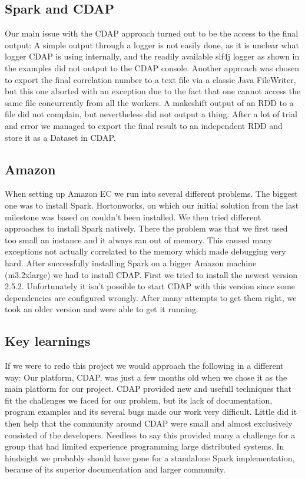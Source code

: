 \documentclass[
10pt, %
a4paper, %
oneside, %
headinclude,footinclude, %
useAMS,
usenatbib
]{template/mn2e}  %
\begin{document}
\subsection{Spark and CDAP}
Our main issue with the CDAP approach turned out to be the access to the final output: A simple output through a logger is not easily done, as it is unclear what logger CDAP is using internally, and the readily available slf4j logger as shown in the examples did not output to the CDAP console. Another approach was chosen to export the final correlation number to a text file via a classic Java FileWriter, but this one aborted with an exception due to the fact that one cannot access the same file concurrently from all the workers. A makeshift output of an RDD to a file did not complain, but nevertheless did not output a thing.
After a lot of trial and error we managed to export the final result to an independent RDD and store it as a Dataset in CDAP.

\subsection{Amazon}
When setting up Amazon EC we run into several different problems. The biggest one was to install Spark. Hortonworks, on which our initial solution from the last milestone was based on couldn’t been installed. We then tried different approaches to install Spark natively. There the problem was that we first used too small an instance and it always ran out of memory. This caused many exceptions not actually correlated to the memory which made debugging very hard. After successfully installing Spark on a bigger Amazon machine (m3.2xlarge) we had to install CDAP. First we tried to install the newest version 2.5.2. Unfortunately it isn’t possible to start CDAP with this version since some dependencies are configured wrongly. After many attempts to get them right, we took an older version and were able to get it running.

\subsection{Key learnings}
If we were to redo this project we would approach the following in a different way:
Our platform, CDAP, was just a few months old when we chose it as the main platform for our project. CDAP provided new and usefull techniques that fit the challenges we faced for our problem, but its lack of documentation, program examples and its several bugs made our work very difficult. Little did it then help that the community around CDAP were small and almost exclusively consisted of the developers.
Needless to say this provided many a challenge for a group that had limited experience programming large distributed systems. In hindsight we probably should have gone for a standalone Spark implementation, because of its superior documentation and larger community.
\end{document}
